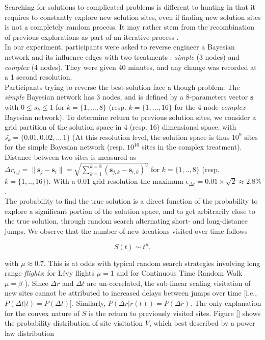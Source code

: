 Searching for solutions to complicated problems is different to hunting in that it requires to constantly explore new solution sites, even if finding new solution sites is not a completely random process. It may rather stem from the recombination of previous explorations as part of an iterative process \cite{}. \\

In our experiment, participants were asked to reverse engineer a Bayesian network and its influence edges with two treatments : {\it simple} (3 nodes) and {\it complex} (4 nodes). They were given 40 minutes, and any change was recorded at a 1 second resolution.\\

Participants trying to reverse the best solution face a though problem: The {\it simple} Bayesian network has 3 nodes, and is defined by a 8-parameters vector $\mathbf{s}$ with $0 \leqslant s_k  \leqslant 1$ for $k = \{1,...,8\}$ (resp. $k = \{1,..., 16\}$ for the 4 node {\it complex} Bayesian network). To determine return to previous solution sites, we consider a grid partition of the solution space in 4 (resp. 16) dimensional space, with $\bar{s_k} = \{0.01,0.02, .., 1\}$ (At this resolution level, the solution space is thus $10^{9}$ sites for the simple Bayesian network (resp. $10^{16}$ sites in the complex treatment). Distance between two sites is measured as $\Delta r_{i,j} = \| \mathbf{s}_j - \mathbf{s}_i \| = \sqrt{\sum_{k=1}^{k=8} (\mathbf{s}_{j,k} - \mathbf{s}_{i,k})^{2}}$ for $k = \{1,..,8\}$ (resp. $k = \{1,..,16\})$. With a $0.01$ grid resolution the maximum $\epsilon_{\Delta r} = 0.01 \times \sqrt{2} \approx 2.8\%$.\\

The probability to find the true solution is a direct function of the probability to explore a significant portion of the solution space, and to get arbitrarily close to the true solution, through random search alternating short- and long-distance jumps. We observe that the number of new locations visited over time follows 

\begin{equation}
S(t)  \sim t^{\mu},
\end{equation}

with $\mu \approx 0.7$. This is at odds with typical random search strategies involving long range {\it flights}: for L\'evy flights $\mu = 1$ \cite{} and for Continuous Time Random Walk $\mu = \beta$ \cite{}). Since $\Delta r$ and $\Delta t$ are un-correlated, the sub-linear scaling visitation of new sites cannot be attributed to increased delays between jumps over time [i.e., $P(\Delta t|t) = P(\Delta t)$]. Similarly, $P(\Delta r|r(t)) = P(\Delta r)$. The only explanation for the convex nature of $S$ is the return to previously visited sites. Figure \ref{} shows the probability distribution of site visitation  $V$, which best described by a power law distribution 

